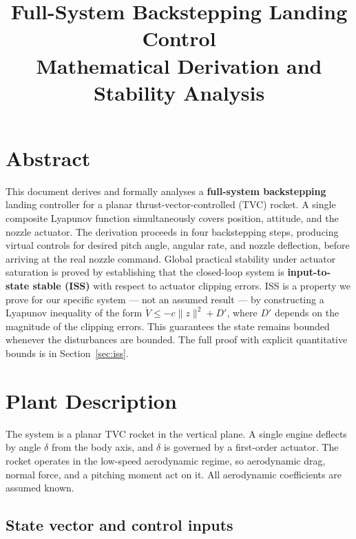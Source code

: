 \documentclass[11pt,a4paper]{article}
\title{\textbf{Full-System Backstepping Landing Control}\\
\large Mathematical Derivation and Stability Analysis}
\author{}
\date{}
\theoremstyle{plain}
\theoremstyle{remark}
\begin{document}
\maketitle
\tableofcontents
\newpage

\section*{Abstract}

This document derives and formally analyses a \textbf{full-system backstepping} landing controller for a planar thrust-vector-controlled (TVC) rocket. A single composite Lyapunov function simultaneously covers position, attitude, and the nozzle actuator. The derivation proceeds in four backstepping steps, producing virtual controls for desired pitch angle, angular rate, and nozzle deflection, before arriving at the real nozzle command. Global practical stability under actuator saturation is proved by establishing that the closed-loop system is \textbf{input-to-state stable (ISS)} with respect to actuator clipping errors. ISS is a property we prove for our specific system --- not an assumed result --- by constructing a Lyapunov inequality of the form $\dot V \leq -c\|z\|^2 + D'$, where $D'$ depends on the magnitude of the clipping errors. This guarantees the state remains bounded whenever the disturbances are bounded. The full proof with explicit quantitative bounds is in Section~\ref{sec:iss}.

\section{Plant Description}

The system is a planar TVC rocket in the vertical plane. A single engine deflects by angle $\delta$ from the body axis, and $\delta$ is governed by a first-order actuator. The rocket operates in the low-speed aerodynamic regime, so aerodynamic drag, normal force, and a pitching moment act on it. All aerodynamic coefficients are assumed known.

\subsection*{State vector and control inputs}
\end{document}
